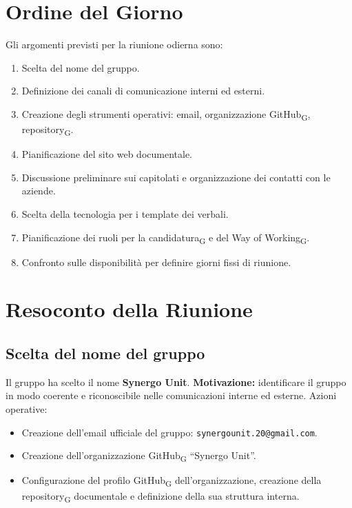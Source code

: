 \section{Ordine del Giorno}
Gli argomenti previsti per la riunione odierna sono:
\begin{enumerate}
    \item Scelta del nome del gruppo.
    \item Definizione dei canali di comunicazione interni ed esterni.
    \item Creazione degli strumenti operativi: email, organizzazione GitHub\textsubscript{G}, repository\textsubscript{G}.
    \item Pianificazione del sito web documentale.
    \item Discussione preliminare sui capitolati e organizzazione dei contatti con le aziende.
    \item Scelta della tecnologia per i template dei verbali.
    \item Pianificazione dei ruoli per la candidatura\textsubscript{G} e del Way of Working\textsubscript{G}.
    \item Confronto sulle disponibilità per definire giorni fissi di riunione.
\end{enumerate}

\section{Resoconto della Riunione}

\subsection{Scelta del nome del gruppo}
Il gruppo ha scelto il nome \textbf{Synergo Unit}.  
\textbf{Motivazione:} identificare il gruppo in modo coerente e riconoscibile nelle comunicazioni interne ed esterne.  
Azioni operative:
\begin{itemize}
    \item Creazione dell’email ufficiale del gruppo: \texttt{synergounit.20@gmail.com}.
    \item Creazione dell’organizzazione GitHub\textsubscript{G} “Synergo Unit”.
    \item Configurazione del profilo GitHub\textsubscript{G} dell’organizzazione, creazione della repository\textsubscript{G} documentale e definizione della sua struttura interna.
\end{itemize}

